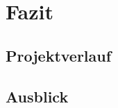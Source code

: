\section{Fazit}
\label{sec:anhang}

\subsection{Projektverlauf}
\label{sec:anhang:verlauf}

\subsection{Ausblick}
\label{sec:anhang:ausblick}

